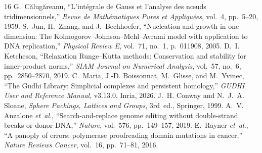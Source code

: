 \documentclass[11pt,a4paper]{article}
\theoremstyle{definition}
\theoremstyle{remark}
\begin{document}
\begin{thebibliography}{16}
G.~C\u{a}lug\u{a}reanu, ``L'int\'egrale de Gauss et l'analyse des n\oe uds tridimensionnels,'' \emph{Revue de Math\'ematiques Pures et Appliqu\'ees}, vol.~4, pp.~5--20, 1959.
S.~Jun, H.~Zhang, and J.~Bechhoefer, ``Nucleation and growth in one dimension: The Kolmogorov--Johnson--Mehl--Avrami model with application to DNA replication,'' \emph{Physical Review E}, vol.~71, no.~1, p.~011908, 2005.
D.~I. Ketcheson, ``Relaxation Runge--Kutta methods: Conservation and stability for inner-product norms,'' \emph{SIAM Journal on Numerical Analysis}, vol.~57, no.~6, pp.~2850--2870, 2019.
C.~Maria, J.-D. Boissonnat, M.~Glisse, and M.~Yvinec, ``The Gudhi Library: Simplicial complexes and persistent homology,'' \emph{GUDHI User and Reference Manual}, v3.13.0, Inria, 2026.
J.~H. Conway and N.~J.~A. Sloane, \emph{Sphere Packings, Lattices and Groups}, 3rd~ed., Springer, 1999.
A.~V. Anzalone \emph{et~al.}, ``Search-and-replace genome editing without double-strand breaks or donor DNA,'' \emph{Nature}, vol.~576, pp.~149--157, 2019.
E.~Rayner \emph{et~al.}, ``A panoply of errors: polymerase proofreading domain mutations in cancer,'' \emph{Nature Reviews Cancer}, vol.~16, pp.~71--81, 2016.
\end{thebibliography}
\end{document}
